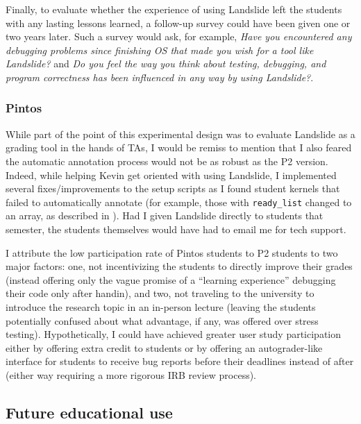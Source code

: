 Finally, to evaluate whether the experience of using Landslide
left the students with any lasting lessons learned,
a follow-up survey could have been given one or two years later.
Such a survey would ask, for example,
{\em Have you encountered any debugging problems since finishing OS that made you wish for a tool like Landslide?}
and
{\em Do you feel the way you think about testing, debugging, and program correctness
has been influenced in any way by using Landslide?}.

\subsubsection{Pintos}

While part of the point of this experimental design was to evaluate Landslide as a grading tool in the hands of TAs,
I would be remiss to mention that I also feared the automatic annotation process would not be as robust as the P2 version.
Indeed, while helping Kevin get oriented with using Landslide,
I implemented
several
fixes/improvements to the setup scripts
as I found student kernels that failed to automatically annotate
(for example, those with {\tt ready\_list} changed to an array,
as described in \sect{\ref{sec:education-pintos-instrumentation}}).
Had I given Landslide directly to students that semester,
the students themselves would have had to email me for tech support.

I attribute the low participation rate of Pintos students to P2 students to two major factors:
one, not incentivizing the students to directly improve their grades
(instead offering only the vague promise of a ``learning experience'' debugging their code only after handin),
and two, not traveling to the university to introduce the research topic in an in-person lecture
(leaving the students potentially confused about what advantage, if any, was offered over stress testing).
Hypothetically, I could have achieved greater user study participation
either by offering extra credit to students
or by offering an autograder-like interface for students to receive bug reports before their deadlines instead of after
(either way requiring a more rigorous IRB review process).

\subsection{Future educational use}


